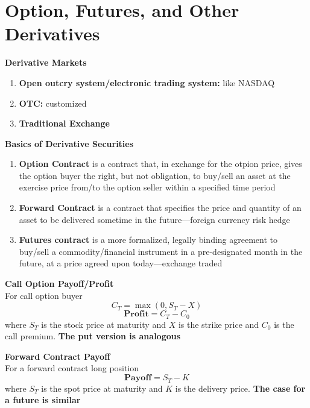 \documentclass[11pt,fleqn]{report} %
\numberwithin{equation}{section} %
\numberwithin{figure}{section} %
\numberwithin{table}{section} %
\begin{document}
\chapter{Option, Futures, and Other Derivatives}
\begin{definition}\textbf{Derivative Markets}
\begin{enumerate}
    \item \textbf{Open outcry system/electronic trading system:} like NASDAQ
    \item \textbf{OTC:} customized
    \item \textbf{Traditional Exchange}
\end{enumerate}
\end{definition}
\begin{definition}\textbf{Basics of Derivative Securities}
\begin{enumerate}
    \item \textbf{Option Contract} is a contract that, in exchange for the otpion price, gives the option buyer the right, but not obligation, to buy/sell an asset at the exercise price from/to the option seller within a specified time period
    \item \textbf{Forward Contract} is a contract that specifies the price and quantity of an asset to be delivered sometime in the future---foreign currency risk hedge
    \item \textbf{Futures contract} is a more formalized, legally binding agreement to buy/sell a commodity/financial instrument in a pre-designated month in the future, at a price agreed upon today---exchange traded
\end{enumerate}
\end{definition}
\begin{theorem}\textbf{Call Option Payoff/Profit}\\
For call option buyer
$$
C_T=\max(0,S_T-X)
$$
$$
\textbf{Profit}=C_T-C_0
$$
where $S_T$ is the stock price at maturity and $X$ is the strike price and $C_0$ is the call premium. \textbf{The put version is analogous}
\end{theorem}
\begin{theorem}\textbf{Forward Contract Payoff}\\
For a forward contract long position
$$
\textbf{Payoff}=S_T-K
$$
where $S_T$ is the spot price at maturity and $K$ is the delivery price. \textbf{The case for a future is similar}
\end{theorem}
\end{document}
